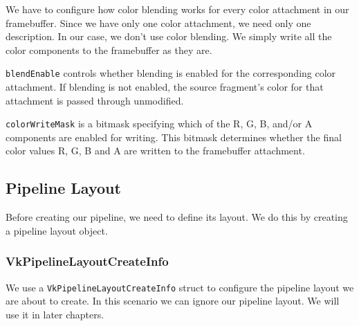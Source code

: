 We have to configure how color blending works for every color attachment
in our framebuffer.
Since we have only one color attachment, we need only one description.
In our case, we don't use color blending.
We simply write all the color components to the framebuffer as they are.

\begin{minipage}{\linewidth}{\noindent}
    
\end{minipage}

\texttt{blendEnable} controls whether blending is enabled for the corresponding
color attachment.
If blending is not enabled, the source fragment's color for that attachment
is passed through unmodified.

\texttt{colorWriteMask} is a bitmask specifying which of the R, G, B, and/or A
components are enabled for writing.
This bitmask determines whether the final color values R, G, B and A are written
to the framebuffer attachment.

\subsection{Pipeline Layout}

Before creating our pipeline, we need to define its layout.
We do this by creating a pipeline layout object.

\begin{minipage}{\linewidth}{\noindent}
    
\end{minipage}

\subsubsection{VkPipelineLayoutCreateInfo}

We use a \texttt{VkPipelineLayoutCreateInfo} struct to configure the pipeline
layout we are about to create.
In this scenario we can ignore our pipeline layout.
We will use it in later chapters.

\begin{minipage}{\linewidth}{\noindent}
    
\end{minipage}

